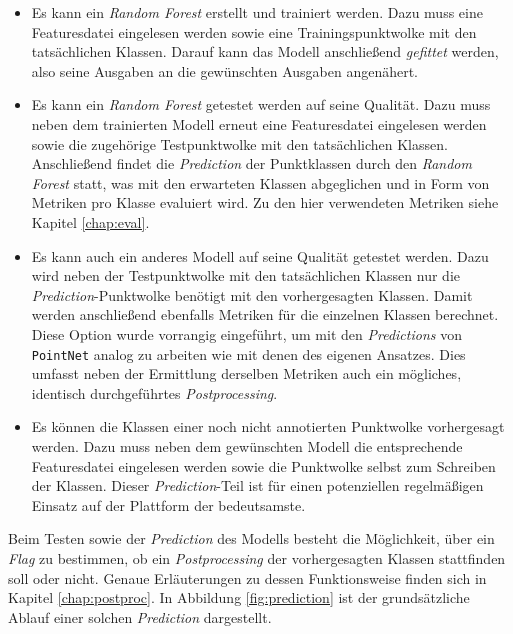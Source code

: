 \begin{itemize}
    \item Es kann ein \textit{Random Forest} erstellt und trainiert werden. Dazu muss eine Featuresdatei eingelesen werden sowie eine Trainingspunktwolke mit den tatsächlichen Klassen. Darauf kann das Modell anschließend \textit{gefittet} werden, also seine Ausgaben an die gewünschten Ausgaben angenähert.
    \item Es kann ein \textit{Random Forest} getestet werden auf seine Qualität. Dazu muss neben dem trainierten Modell erneut eine Featuresdatei eingelesen werden sowie die zugehörige Testpunktwolke mit den tatsächlichen Klassen. Anschließend findet die \textit{Prediction} der Punktklassen durch den \textit{Random Forest} statt, was mit den erwarteten Klassen abgeglichen und in Form von Metriken pro Klasse evaluiert wird. Zu den hier verwendeten Metriken siehe Kapitel \ref{chap:eval}.
    \item Es kann auch ein anderes Modell auf seine Qualität getestet werden. Dazu wird neben der Testpunktwolke mit den tatsächlichen Klassen nur die \textit{Prediction}-Punktwolke benötigt mit den vorhergesagten Klassen. Damit werden anschließend ebenfalls Metriken für die einzelnen Klassen berechnet. Diese Option wurde vorrangig eingeführt, um mit den \textit{Predictions} von \texttt{PointNet} analog zu arbeiten wie mit denen des eigenen Ansatzes. Dies umfasst neben der Ermittlung derselben Metriken auch ein mögliches, identisch durchgeführtes \textit{Postprocessing}.
    \item Es können die Klassen einer noch nicht annotierten Punktwolke vorhergesagt werden. Dazu muss neben dem gewünschten Modell die entsprechende Featuresdatei eingelesen werden sowie die Punktwolke selbst zum Schreiben der Klassen. Dieser \textit{Prediction}-Teil ist für einen potenziellen regelmäßigen Einsatz auf der Plattform der bedeutsamste.
\end{itemize}
Beim Testen sowie der \textit{Prediction} des Modells besteht die Möglichkeit, über ein \textit{Flag} zu bestimmen, ob ein \textit{Postprocessing} der vorhergesagten Klassen stattfinden soll oder nicht. Genaue Erläuterungen zu dessen Funktionsweise finden sich in Kapitel \ref{chap:postproc}. In Abbildung \ref{fig:prediction} ist der grundsätzliche Ablauf einer solchen \textit{Prediction} dargestellt.


